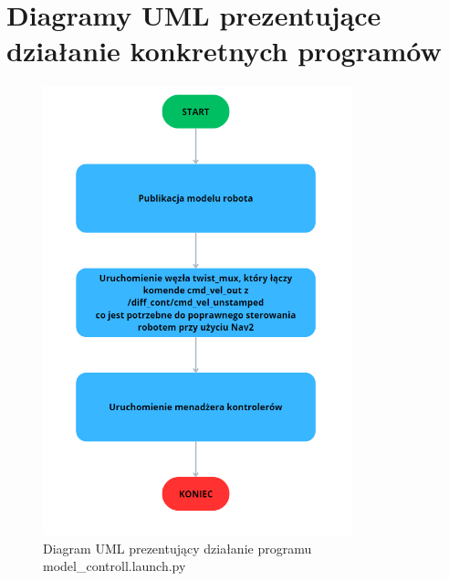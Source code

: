 \documentclass[a4paper,twoside,12pt]{book}
\begin{document}
\section{Diagramy UML prezentujące działanie konkretnych programów}
\begin{figure}[!hb]
	\centering
	\includegraphics[width=0.8\textwidth]{images/uml-model.png}
	\caption{Diagram UML prezentujący działanie programu model\_controll.launch.py}
	\label{fig:diagram-model}
\end{figure}
\end{document}
